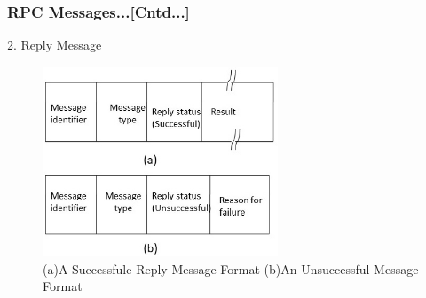 \documentclass{beamer}
\begin{document}
\begin{frame}
	\frametitle{RPC Messages...[Cntd...]}
	\vspace{0.5cm}
	2. Reply Message\\
	\begin{figure}
		\centering
		\includegraphics[width=7cm]{fig44.jpg}
		\caption{(a)A Successfule Reply Message Format (b)An Unsuccessful Message Format}
	\end{figure}
\end{frame}
\end{document}
